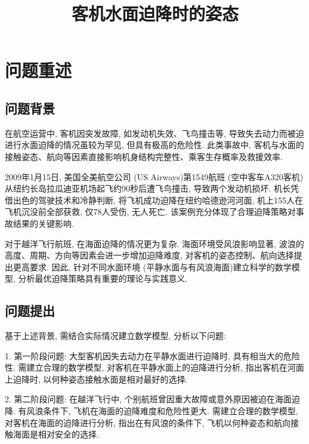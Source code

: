 \documentclass{cumcmthesis}
\title{客机水面迫降时的姿态}
\begin{document}
 \maketitle
 \begin{abstract}%

\end{abstract}



\section{问题重述}
\subsection{问题背景}
在航空运营中, 客机因突发故障, 如发动机失效、飞鸟撞击等, 导致失去动力而被迫进行水面迫降的情况虽较为罕见, 但具有极高的危险性. 此类事故中, 客机与水面的接触姿态、航向等因素直接影响机身结构完整性、乘客生存概率及救援效率. 

2009年1月15日, 美国全美航空公司 (US Airways)第1549航班 (空中客车A320客机)从纽约长岛拉瓜迪亚机场起飞约90秒后遭飞鸟撞击, 导致两个发动机损坏. 机长凭借出色的驾驶技术和冷静判断, 将飞机成功迫降在纽约哈德逊河河面, 机上155人在飞机沉没前全部获救, 仅78人受伤, 无人死亡. 该案例充分体现了合理迫降策略对事故结果的关键影响. 

对于越洋飞行航班, 在海面迫降的情况更为复杂. 海面环境受风浪影响显著, 波浪的高度、周期、方向等因素会进一步增加迫降难度, 对客机的姿态控制、航向选择提出更高要求. 因此, 针对不同水面环境 (平静水面与有风浪海面)建立科学的数学模型, 分析最优迫降策略具有重要的理论与实践意义. 

\subsection{问题提出}
基于上述背景, 需结合实际情况建立数学模型, 分析以下问题:

1. 第一阶段问题: 大型客机因失去动力在平静水面进行迫降时, 具有相当大的危险性. 需建立合理的数学模型, 对客机在平静水面上的迫降进行分析, 指出客机在河面上迫降时, 以何种姿态接触水面是相对最好的选择. 

2. 第二阶段问题: 在越洋飞行中, 个别航班曾因重大故障或意外原因被迫在海面迫降. 有风浪条件下, 飞机在海面的迫降难度和危险性更大. 需建立合理的数学模型, 对客机在海面的迫降进行分析, 指出在有风浪的条件下, 飞机以何种姿态和航向接触海面是相对安全的选择. 
\end{document}
